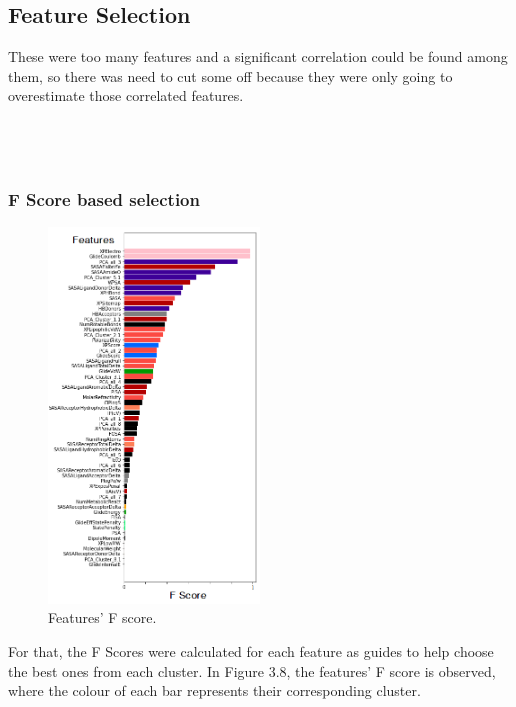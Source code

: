 \subsection{Feature Selection}
These were too many features and a significant correlation could be found among them, so there was need to cut some off because they were only going to overestimate those correlated features.\\\\\\\\

\subsubsection{\hspace{8.85cm}F Score based selection}
\begin{figure}
\vspace{-60pt}
\begin{center}
\includegraphics[width=0.50\textwidth]{Images/Results/Feature Analysis/fscore.png}
\caption{\centering Features' F score.}
\vspace{-20pt}
\end{center}
\end{figure}
For that, the F Scores were calculated for each feature as guides to help choose the best ones from each cluster. In Figure 3.8, the features' F score is observed, where the colour of each bar represents their corresponding cluster.\\

